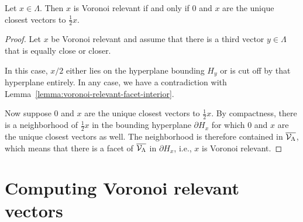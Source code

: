 \begin{lemma}
  \label{lemma:voronoi-relevant-as-closest}
  Let $x \in \Lambda$.
  Then $x$ is Voronoi relevant if and only if
  $0$ and $x$ are the unique closest vectors to $\frac{1}{2} x$.
\end{lemma}
\begin{proof}
  Let $x$ be Voronoi relevant and
  assume that there is a third vector $y \in \Lambda$ that is equally close or closer.
  \begin{center}
  \end{center}
  In this case, $x/2$ either lies on the hyperplane bounding $H_y$
  or is cut off by that hyperplane entirely.
  In any case, we have a contradiction with Lemma~\ref{lemma:voronoi-relevant-facet-interior}.

  Now suppose $0$ and $x$ are the unique closest vectors to $\frac{1}{2} x$.
  By compactness, there is a neighborhood of $\frac{1}{2} x$
  in the bounding hyperplane $\partial H_x$
  for which $0$ and $x$ are the unique closest vectors as well.
  The neighborhood is therefore contained in $\overline{\mathcal{V}_\Lambda}$,
  which means that there is a facet of $\overline{\mathcal{V}_\Lambda}$ in $\partial H_x$,
  i.e., $x$ is Voronoi relevant.
\end{proof}



\section{Computing Voronoi relevant vectors}

